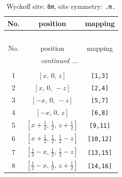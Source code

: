 \documentclass[fleqn,8pt]{jsarticle}
\begin{document}
\begin{longtable}{ccc}
\caption{Wyckoff site: {\tt 8m}, site symmetry: {\tt .m.}}
 \\
 \hline \hline
No. & position & mapping \\ \hline \endfirsthead

\multicolumn{2}{l}{\tablename\ \thetable{}} \\
 \hline \hline
No. & position & mapping \\ \hline \endhead

 \hline \hline
\multicolumn{2}{r}{\footnotesize\it continued ...} \\ \endfoot

 \hline \hline
\multicolumn{2}{r}{} \\ \endlastfoot

1 & $\left[ x,\, 0,\, z \right]$ & {\tt [1,3]} \\ \hline
2 & $\left[ x,\, 0,\, - z \right]$ & {\tt [2,4]} \\ \hline
3 & $\left[ - x,\, 0,\, - z \right]$ & {\tt [5,7]} \\ \hline
4 & $\left[ - x,\, 0,\, z \right]$ & {\tt [6,8]} \\ \hline
5 & $\left[ x + \frac{1}{2},\, \frac{1}{2},\, z + \frac{1}{2} \right]$ & {\tt [9,11]} \\ \hline
6 & $\left[ x + \frac{1}{2},\, \frac{1}{2},\, \frac{1}{2} - z \right]$ & {\tt [10,12]} \\ \hline
7 & $\left[ \frac{1}{2} - x,\, \frac{1}{2},\, \frac{1}{2} - z \right]$ & {\tt [13,15]} \\ \hline
8 & $\left[ \frac{1}{2} - x,\, \frac{1}{2},\, z + \frac{1}{2} \right]$ & {\tt [14,16]} \\
\end{longtable}
\renewcommand{\arraystretch}{1.2}
\end{document}
